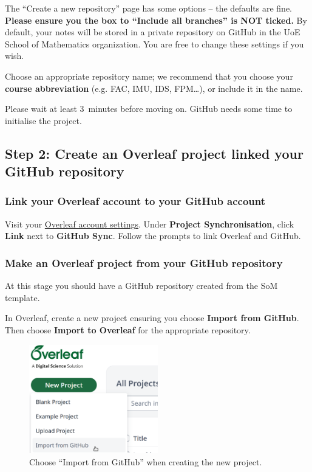 The ``Create a new repository'' page has some options -- the defaults are fine. \textbf{Please ensure you the box to ``Include all branches'' is NOT ticked.} By default, your notes will be stored in a private repository on GitHub in the UoE School of Mathematics organization. You are free to change these settings if you wish.

Choose an appropriate repository name; we recommend that you choose your \textbf{course abbreviation} (e.g. FAC, IMU, IDS, FPM\ldots), or include it in the name.

Please wait at least 3~minutes before moving on. GitHub needs some time to initialise the project.


\subsection{Step 2: Create an Overleaf project linked your GitHub repository}

\subsubsection{Link your Overleaf account to your GitHub account}

Visit your \href{https://www.overleaf.com/user/settings}{Overleaf account settings}. Under \textbf{Project Synchronisation}, click \textbf{Link} next to \textbf{GitHub Sync}. Follow the prompts to link Overleaf and GitHub.

\subsubsection{Make an Overleaf project from your GitHub repository}

At this stage you should have a GitHub repository created from the SoM template.

In Overleaf, create a new project ensuring you choose \textbf{Import from GitHub}. Then choose \textbf{Import to Overleaf} for the appropriate repository.

\begin{figure}[h]
    \centering
    \includegraphics[width=0.5\textwidth]{img/overleaf_new.png}
    \caption{Choose ``Import from GitHub'' when creating the new project.}
    \label{fig:gh-overleaf-new}
\end{figure}

